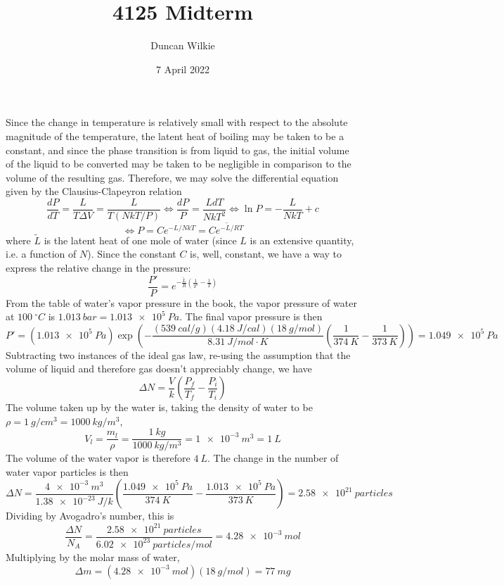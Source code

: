 \documentclass{article}
\title{4125 Midterm}
\author{Duncan Wilkie}
\date{7 April 2022}
\begin{document}
\maketitle

\section{}
Since the change in temperature is relatively small with respect to the absolute magnitude of the temperature, the latent heat of boiling may be taken to be a constant, and since the phase transition is from liquid to gas, the initial volume of the liquid to be converted may be taken to be negligible in comparison to the volume of the resulting gas.
Therefore, we may solve the differential equation given by the Clausius-Clapeyron relation
\[\frac{dP}{dT}=\frac{L}{T\Delta V}=\frac{L}{T(NkT/P)}\Leftrightarrow \frac{dP}{P}=\frac{LdT}{NkT^{2}}\Leftrightarrow \ln P=-\frac{L}{NkT}+c\]
\[\Leftrightarrow P=Ce^{-L/NkT}=Ce^{-\tilde{L}/RT}\]
where $\tilde{L}$ is the latent heat of one mole of water (since $L$ is an extensive quantity, i.e. a function of $N$).
Since the constant $C$ is, well, constant, we have a way to express the relative change in the pressure:
\[\frac{P'}{P}=e^{-\frac{\tilde{L}}{R}\left( \frac{1}{T'}-\frac{1}{T} \right)}\]
From the table of water's vapor pressure in the book, the vapor pressure of water at $\SI{100}{^{\circ} C}$ is $\SI{1.013}{bar}=\SI{1.013e5}{Pa}$.
The final vapor pressure is then
\[P'=(\SI{1.013e5}{Pa})\exp\left( -\frac{(\SI{539}{cal/g})(\SI{4.18}{J/cal})(\SI{18}{g/mol})}{\SI{8.31}{J/mol\cdot K}}\left( \frac{1}{\SI{374}{K}}-\frac{1}{\SI{373}{K}} \right)\right)=\SI{1.049e5}{Pa}\]
Subtracting two instances of the ideal gas law, re-using the assumption that the volume of liquid and therefore gas doesn't appreciably change, we have
\[\Delta N=\frac{V}{k}\left( \frac{P_{f}}{T_{f}}-\frac{P_{i}}{T_{i}}\right)\]
The volume taken up by the water is, taking the density of water to be $\rho=\SI{1}{g/cm^{3}}=\SI{1000}{kg/m^{3}}$,
\[V_{l}=\frac{m_{l}}{\rho}=\frac{\SI{1}{kg}}{\SI{1000}{kg/m^{3}}}=\SI{1e-3}{m^{3}}=\SI{1}{L}\]
The volume of the water vapor is therefore $\SI{4}{L}$.
The change in the number of water vapor particles is then
\[\Delta N=\frac{\SI{4e-3}{m ^{3}}}{\SI{1.38e-23}{J/k}}\left( \frac{\SI{1.049e5}{Pa}}{\SI{374}{K}}-\frac{\SI{1.013e5}{Pa}}{\SI{373}{K}} \right)=\SI{2.58e21}{particles}\]
Dividing by Avogadro's number, this is
\[\frac{\Delta N}{N_{A}}=\frac{\SI{2.58e21}{particles}}{\SI{6.02e23}{particles / mol}}=\SI{4.28e-3}{mol}\]
Multiplying by the molar mass of water,
\[\Delta m=(\SI{4.28e-3}{mol})(\SI{18}{g/mol})=\SI{77}{mg}\]
\end{document}
